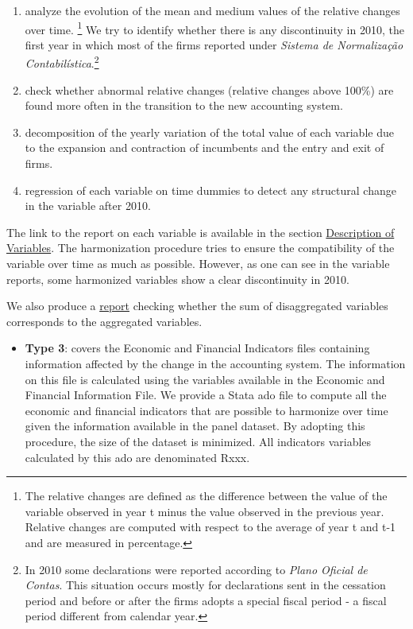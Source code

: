 \documentclass[]{book}
\providecommand{\tightlist}{%
  \setlength{\itemsep}{0pt}\setlength{\parskip}{0pt}}
\let\rmarkdownfootnote\footnote%
\def\footnote{\protect\rmarkdownfootnote}
\begin{document}
\begin{enumerate}
\def\labelenumi{\arabic{enumi}.}
\tightlist
\item
  analyze the evolution of the mean and medium values of the relative changes over time. \footnote{The relative changes are defined as the difference between the value of the variable observed in year t minus the value observed in the previous year. Relative changes are computed with respect to the average of year t and t-1 and are measured in percentage.} We try to identify whether there is any discontinuity in 2010, the first year in which most of the firms reported under \emph{Sistema de Normalização Contabilística}.\footnote{In 2010 some declarations were reported according to \emph{Plano Oficial de Contas}. This situation occurs mostly for declarations sent in the cessation period and before or after the firms adopts a special fiscal period - a fiscal period different from calendar year.}
\item
  check whether abnormal relative changes (relative changes above 100\%) are found more often in the transition to the new accounting system.
\item
  decomposition of the yearly variation of the total value of each variable due to the expansion and contraction of incumbents and the entry and exit of firms.
\item
  regression of each variable on time dummies to detect any structural change in the variable after 2010.
\end{enumerate}

The link to the report on each variable is available in the section \protect\hyperlink{description-of-variables}{Description of Variables}.
The harmonization procedure tries to ensure the compatibility of the variable over time as much as possible. However, as one can see in the variable reports, some harmonized variables show a clear discontinuity in 2010.

We also produce a \href{./Auxiliary\%20Files/technical_reports/CONTAS_MG_checks.pdf}{report} checking whether the sum of disaggregated variables corresponds to the aggregated variables.

\begin{itemize}
\tightlist
\item
  \textbf{Type 3}: covers the Economic and Financial Indicators files containing information affected by the change in the accounting system. The information on this file is calculated using the variables available in the Economic and Financial Information File. We provide a Stata ado file to compute all the economic and financial indicators that are possible to harmonize over time given the information available in the panel dataset. By adopting this procedure, the size of the dataset is minimized. All indicators variables calculated by this ado are denominated Rxxx.
\end{itemize}
\end{document}
